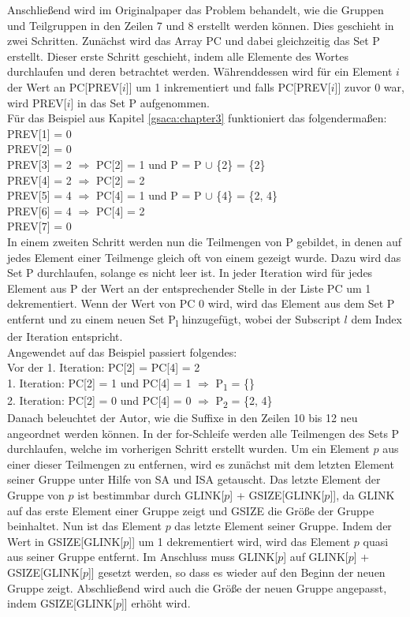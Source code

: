 Anschließend wird im Originalpaper das Problem behandelt, wie die Gruppen und Teilgruppen in den Zeilen 7 und 8 erstellt werden können. 
Dies geschieht in zwei Schritten. 
Zunächst wird das Array PC und dabei gleichzeitig das Set P erstellt. 
Dieser erste Schritt geschieht, indem alle Elemente des Wortes durchlaufen und deren \prevpointer betrachtet werden. 
Währenddessen wird für ein Element $i$ der Wert an PC[PREV[$i$]] um 1 inkrementiert und falls PC[PREV[$i$]] zuvor 0 war, wird PREV[$i$] in das Set P aufgenommen.\\
Für das Beispiel aus Kapitel \ref{gsaca:chapter3} funktioniert das folgendermaßen:\\
PREV[1] = 0\\
PREV[2] = 0\\
PREV[3] = 2 $\Rightarrow$ PC[2] = 1 und P = P $\cup$ \{2\} = \{2\}\\
PREV[4] = 2 $\Rightarrow$ PC[2] = 2\\
PREV[5] = 4 $\Rightarrow$ PC[4] = 1 und P = P $\cup$ \{4\} = \{2, 4\}\\
PREV[6] = 4 $\Rightarrow$ PC[4] = 2\\
PREV[7] = 0\\
In einem zweiten Schritt werden nun die Teilmengen von P gebildet, in denen auf jedes Element einer Teilmenge gleich oft von einem \prevpointer gezeigt wurde. 
Dazu wird das Set P durchlaufen, solange es nicht leer ist. 
In jeder Iteration wird für jedes Element aus P der Wert an der entsprechender Stelle in der Liste PC um 1 dekrementiert. 
Wenn der Wert von PC 0 wird, wird das Element aus dem Set P entfernt und zu einem neuen Set P\textsubscript{l} hinzugefügt, wobei der Subscript $l$ dem Index der Iteration entspricht. \\
Angewendet auf das Beispiel passiert folgendes:\\
Vor der 1. Iteration: PC[2] = PC[4] = 2\\
1. Iteration: PC[2] = 1 und PC[4] = 1 $\Rightarrow$ P\textsubscript{1} = \{\} \\
2. Iteration: PC[2] = 0 und PC[4] = 0 $\Rightarrow$ P\textsubscript{2} = \{2, 4\}\\

Danach beleuchtet der Autor, wie die Suffixe in den Zeilen 10 bis 12 neu angeordnet werden können. 
In der for-Schleife werden alle Teilmengen des Sets P durchlaufen, welche im vorherigen Schritt erstellt wurden. 
Um ein Element $p$ aus einer dieser Teilmengen zu entfernen, wird es zunächst mit dem letzten Element seiner Gruppe unter Hilfe von SA und ISA getauscht. 
Das letzte Element der Gruppe von $p$ ist bestimmbar durch GLINK[$p$] + GSIZE[GLINK[$p$]], da GLINK auf das erste Element einer Gruppe zeigt und GSIZE die Größe der Gruppe beinhaltet. 
Nun ist das Element $p$ das letzte Element seiner Gruppe. 
Indem der Wert in GSIZE[GLINK[$p$]] um 1 dekrementiert wird, wird das Element $p$ quasi aus seiner Gruppe entfernt. 
Im Anschluss muss GLINK[$p$] auf GLINK[$p$] + GSIZE[GLINK[$p$]] gesetzt werden, so dass es wieder auf den Beginn der neuen Gruppe zeigt. 
Abschließend wird auch die Größe der neuen Gruppe angepasst, indem GSIZE[GLINK[$p$]] erhöht wird.\\

